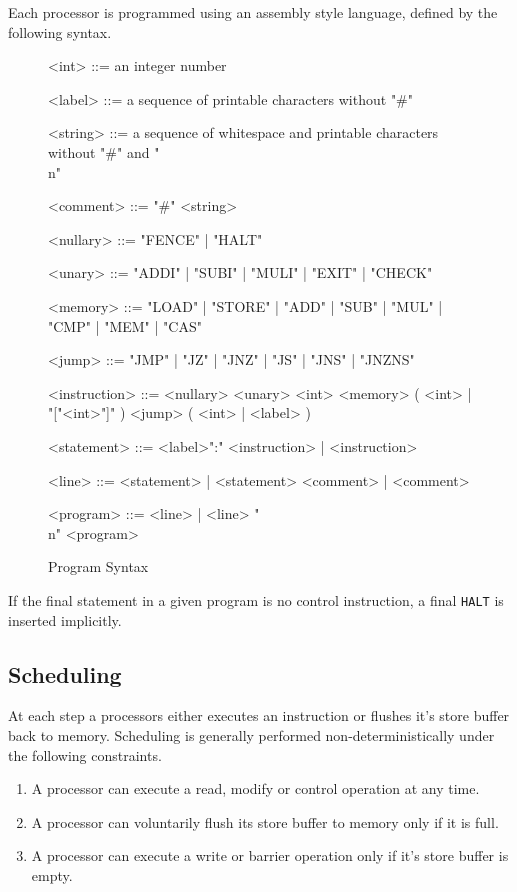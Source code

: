 Each processor is programmed using an assembly style language, defined by the following syntax.

\begin{figure}[h]
\begin{grammar}
\small

<int> ::= an integer number

<label> ::= a sequence of printable characters without "#"

<string> ::= a sequence of whitespace and printable characters without "#" and "\\n"

<comment> ::= "#" <string>

<nullary> ::= "FENCE" | "HALT"

<unary> ::= "ADDI" | "SUBI" | "MULI" | "EXIT" | "CHECK"

<memory> ::= "LOAD" | "STORE" | "ADD" | "SUB" | "MUL" | "CMP" | "MEM" | "CAS"

<jump> ::= "JMP" | "JZ" | "JNZ" | "JS" | "JNS" | "JNZNS"

<instruction> ::= <nullary>
\alt <unary> <int>
\alt <memory> ( <int> | "["<int>"]" )
\alt <jump> ( <int> | <label> )

<statement> ::= <label>":" <instruction> | <instruction>

<line> ::= <statement> | <statement> <comment> | <comment>

<program> ::= <line> | <line> "\\n" <program>
\end{grammar}
\caption{Program Syntax}
\label{fig:syntax:program}
\end{figure}

If the final statement in a given program is no control instruction, a final \texttt{HALT} is inserted implicitly.

\subsection{Scheduling}

At each step a processors either executes an instruction or flushes it's store buffer back to memory.
Scheduling is generally performed non-deterministically under the following constraints.

\begin{enumerate}
  \item A processor can execute a read, modify or control operation at any time.
  \item A processor can voluntarily flush its store buffer to memory only if it is full.
  \item A processor can execute a write or barrier operation only if it's store buffer is empty.
\end{enumerate}

